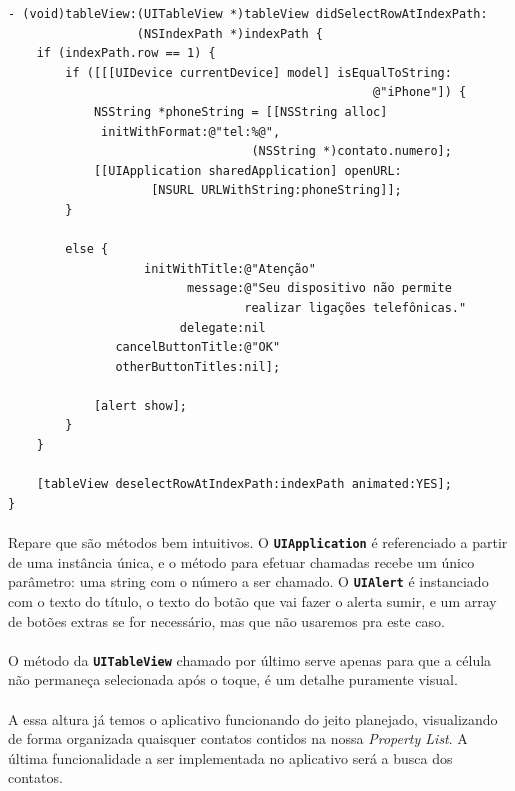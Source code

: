 \documentclass[a4paper,12pt,brazil,doubleside]{book}
\begin{document}
\begin{listing}
\begin{verbatim}
- (void)tableView:(UITableView *)tableView didSelectRowAtIndexPath:
                  (NSIndexPath *)indexPath {
    if (indexPath.row == 1) {
        if ([[[UIDevice currentDevice] model] isEqualToString:
                                                   @"iPhone"]) {
            NSString *phoneString = [[NSString alloc] 
             initWithFormat:@"tel:%@",
                                  (NSString *)contato.numero];
            [[UIApplication sharedApplication] openURL:
                    [NSURL URLWithString:phoneString]];
        }

        else {
                   initWithTitle:@"Atenção"
                         message:@"Seu dispositivo não permite
                                 realizar ligações telefônicas."
                        delegate:nil
               cancelButtonTitle:@"OK"
               otherButtonTitles:nil];
               
            [alert show];
        }
    }
    
    [tableView deselectRowAtIndexPath:indexPath animated:YES];
}
\end{verbatim}
\end{listing}

\paragraph{}Repare que são métodos bem intuitivos. O \texttt{\textbf{UIApplication}} é referenciado a partir de uma instância única, e o método para efetuar chamadas recebe um único parâmetro: uma string com o número a ser chamado. O \texttt{\textbf{UIAlert}} é instanciado com o texto do título, o texto do botão que vai fazer o alerta sumir, e um array de botões extras se for necessário, mas que não usaremos pra este caso.
\paragraph{}O método da \texttt{\textbf{UITableView}} chamado por último serve apenas para que a célula não permaneça selecionada após o toque, é um detalhe puramente visual.

\bigskip
\bigskip

\paragraph{}A essa altura já temos o aplicativo funcionando do jeito planejado, visualizando de forma organizada quaisquer contatos contidos na nossa \emph{Property List}. A última funcionalidade a ser implementada no aplicativo será a busca dos contatos.
\end{document}

